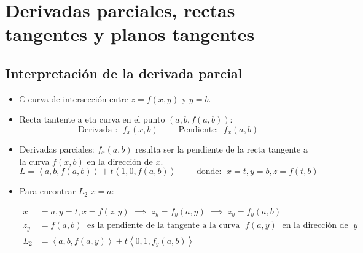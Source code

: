
\section{Derivadas parciales, rectas tangentes y planos tangentes}

\subsection{Interpretación de la derivada parcial}
\begin{itemize}
    \item $\mathbb{C}$ curva de intersección entre $z=f(x,y)$ y $y=b$.
    \item Recta tantente a eta curva en el punto $(a,b,f(a,b))$:
        \[
          \text{  Derivada : }\; f_x(x,b) \quad \quad \text{  Pendiente:  }\; f_x(a,b)
        \]
    
    \item Derivadas parciales: $f_x(a,b)$ resulta ser la pendiente de la recta tangente a la curva $f(x,b)$ en la dirección de $x$.
        \[
          L = \left\langle a,b,f(a,b) \right\rangle + t \left\langle 1,0,f(a,b) \right\rangle \quad \quad \text{  donde:  } \; x =t, y=b,z=f(t,b) 
        \]
    
    \item  Para encontrar $L_2$ $x=a$:
        \begin{center}
           \begin{align*}
               x&=a, y=t, x=f(z,y) \;\implies\; z_y=f_y(a,y) \; \implies \; z_y=f_y(a,b) \\ 
               z_y&=f(a,b) \; \text{  es la pendiente de la tangente  a la curva   }\; f(a,y) \; \text{  en la dirección de   }\; y \\   
               L_2 &= \left\langle a,b,f(a,y) \right\rangle + t \left\langle 0,1,f_y(a,b) \right\rangle \\ 
           \end{align*}
        \end{center}
    

\end{itemize}
